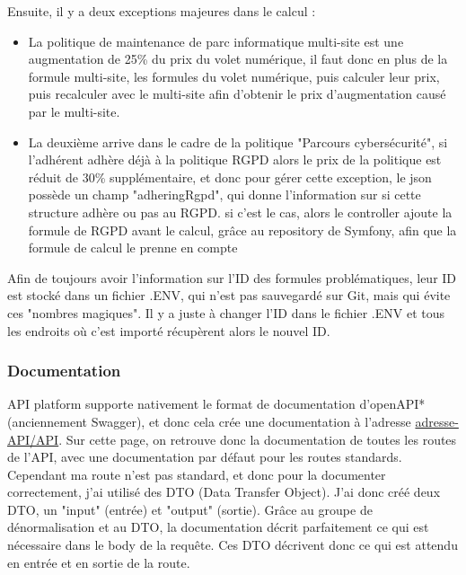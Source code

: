 \documentclass[a4paper,12pt]{report}
\begin{document}
Ensuite, il y a deux exceptions majeures dans le calcul :
\begin{itemize}
    \item La politique de maintenance de parc informatique multi-site est une augmentation de 25\% du prix du volet numérique, il faut donc en plus de la formule multi-site, les formules du volet numérique, puis calculer leur prix, puis recalculer avec le multi-site afin d'obtenir le prix d'augmentation causé par le multi-site.
    \item La deuxième arrive dans le cadre de la politique "Parcours cybersécurité", si l'adhérent adhère déjà à la politique RGPD alors le prix de la politique est réduit de 30\% supplémentaire, et donc pour gérer cette exception, le json possède un champ "adheringRgpd", qui donne l'information sur si cette structure adhère ou pas au RGPD. si c'est le cas, alors le controller ajoute la formule de RGPD avant le calcul, grâce au repository de Symfony, afin que la formule de calcul le prenne en compte
\end{itemize} 
Afin de toujours avoir l'information sur l'ID des formules problématiques, leur ID est stocké dans un fichier .ENV, qui n'est pas sauvegardé sur Git, mais qui évite ces "nombres magiques". Il y a juste à changer l'ID dans le fichier .ENV et tous les endroits où c'est importé récupèrent alors le nouvel ID.

\subsubsection{Documentation}

API platform supporte nativement le format de documentation d'openAPI* (anciennement Swagger), et donc cela crée une documentation à l'adresse \href{https://dev.API.numerobis.atd16.fr/API}{adresse-API/API}. Sur cette page, on retrouve donc la documentation de toutes les routes de l'API, avec une documentation par défaut pour les routes standards. Cependant ma route n'est pas standard, et donc pour la documenter correctement, j'ai utilisé des DTO (Data Transfer Object). J'ai donc créé deux DTO, un "input" (entrée) et "output" (sortie). Grâce au groupe de dénormalisation et au DTO, la documentation décrit parfaitement ce qui est nécessaire dans le body de la requête. Ces DTO décrivent donc ce qui est attendu en entrée et en sortie de la route.
\end{document}
